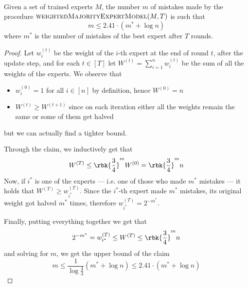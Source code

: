\documentclass[a4paper, 12pt]{report}
\begin{document}
    \begin{framedthm}{}
        Given a set of trained experts $M$, the number $m$ of mistakes made by the procedure $\textsc{weightedMajorityExpertModel}(M, T)$ is such that $$m \le 2.41 \cdot (m^* + \log n)$$ where $m^*$ is the number of mistakes of the best expert after $T$ rounds.
    \end{framedthm}

    \begin{proof}
        Let $w^{(t)}_i$ be the weight of the $i$-th expert at the end of round $t$, after the update step, and for each $t \in [T]$ let $W^{(t)} = \sum_{i = 1}^{n}{w_i^{(t)}}$ be the sum of all the weights of the experts. We observe that
        
        \begin{itemize}
            \item $w_i^{(0)} = 1$ for all $i \in [n]$ by definition, hence $W^{(0)} = n$
            \item $W^{(t)} \ge W^{(t + 1)}$ since on each iteration either all the weights remain the same or some of them get halved
        \end{itemize}

        but we can actually find a tighter bound.


        Through the claim, we inductively get that $$W^{(T)} \le \rbk{\dfrac{3}{4}}^m W^{(0)} = \rbk{\dfrac{3}{4}}^m n$$ Now, if $i^*$ is one of the  experts --- i.e. one of those who made $m^*$ mistakes --- it holds that $W^{(T)} \ge w_{i^*}^{(T)}$. Since the $i^*$-th expert made $m^*$ mistakes, its original weight got halved $m^*$ times, therefore $w_{i^*}^{(T)} = 2^{-m^*}$.

        Finally, putting everything together we get that $$2^{-m^*} = w_{i^*}^{(T)} \le W^{(T)} \le \rbk{\dfrac{3}{4}}^m n$$ and solving for $m$, we get the upper bound of the claim $$m \le \dfrac{1}{\log \tfrac{4}{3}} (m^* + \log n) \le 2.41 \cdot (m^* + \log n)$$
    \end{proof}
\end{document}
